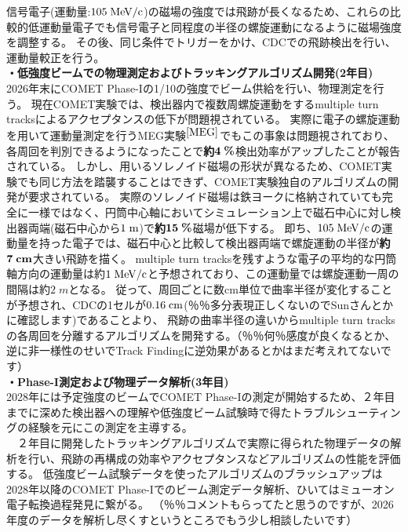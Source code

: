 \documentclass[11pt,a4j,dvipdfmx]{jarticle} 					%
\newcommand{\研究課題名}{ミューオン電子転換探索の感度向上に向けた解析手法の開発}
\newcommand{\研究機関名}{大阪大学}
\newcommand{\研究代表者氏名}{高見 翔太   }
\begin{document}
信号電子(運動量:$105\;\rm{MeV/c}$)の磁場の強度では飛跡が長くなるため、これらの比較的低運動量電子でも信号電子と同程度の半径の螺旋運動になるように磁場強度を調整する。
その後、同じ条件でトリガーをかけ、CDCでの飛跡検出を行い、運動量較正を行う。
\\
\noindent
\textbf{・低強度ビームでの物理測定およびトラッキングアルゴリズム開発(2年目)}\\
2026年末にCOMET Phase-Iの1/10の強度でビーム供給を行い、物理測定を行う。
現在COMET実験では、検出器内で複数周螺旋運動をするmultiple turn tracksによるアクセプタンスの低下が問題視されている。
実際に電子の螺旋運動を用いて運動量測定を行うMEG実験$^{\cite{MEG}}$でもこの事象は問題視されており、各周回を判別できるようになったことで\textbf{約}$\mathbf{4\;\rm{\textbf{\%}}}$検出効率がアップしたことが報告されている。
しかし、用いるソレノイド磁場の形状が異なるため、COMET実験でも同じ方法を踏襲することはできず、COMET実験独自のアルゴリズムの開発が要求されている。
実際のソレノイド磁場は鉄ヨークに格納されていても完全に一様ではなく、円筒中心軸においてシミュレーション上で磁石中心に対し検出器両端(磁石中心から$1\;\rm{m}$)で\textbf{約}$\mathbf{15\;\rm{\textbf{\%}}}$磁場が低下する。
即ち、$105\;\rm{MeV/c}$の運動量を持った電子では、磁石中心と比較して検出器両端で螺旋運動の半径が\textbf{約}$\mathbf{7\;\rm{\textbf{cm}}}$大きい飛跡を描く。
multiple turn tracksを残すような電子の平均的な円筒軸方向の運動量は約$1\;\rm{MeV/c}$と予想されており、この運動量では螺旋運動一周の間隔は約$2\;{m}$となる。
従って、周回ごとに数cm単位で曲率半径が変化することが予想され、CDCの1セルが$0.16\;\rm{cm}$(％％多分表現正しくないのでSunさんとかに確認します)であることより、
飛跡の曲率半径の違いからmultiple turn tracksの各周回を分離するアルゴリズムを開発する。（％％何％感度が良くなるとか、逆に非一様性のせいでTrack Findingに逆効果があるとかはまだ考えれてないです）
\\
\noindent
\textbf{・Phase-I測定および物理データ解析(3年目)}\\
2028年には予定強度のビームでCOMET Phase-Iの測定が開始するため、２年目までに深めた検出器への理解や低強度ビーム試験時で得たトラブルシューティングの経験を元にこの測定を主導する。\\
　２年目に開発したトラッキングアルゴリズムで実際に得られた物理データの解析を行い、飛跡の再構成の効率やアクセプタンスなどアルゴリズムの性能を評価する。
低強度ビーム試験データを使ったアルゴリズムのブラッシュアップは2028年以降のCOMET Phase-Iでのビーム測定データ解析、ひいてはミューオン電子転換過程発見に繋がる。
（％％コメントもらってたと思うのですが、2026年度のデータを解析し尽くすというところでもう少し相談したいです）
\end{document}
